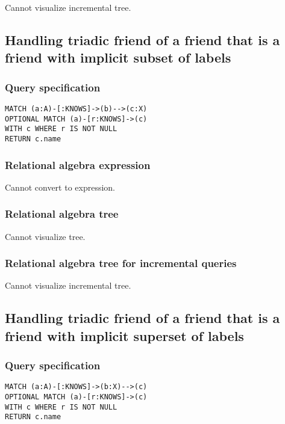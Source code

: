 Cannot visualize incremental tree.

\subsection{Handling triadic friend of a friend that is a friend with implicit subset of labels}

\subsubsection*{Query specification}

\begin{lstlisting}
MATCH (a:A)-[:KNOWS]->(b)-->(c:X)
OPTIONAL MATCH (a)-[r:KNOWS]->(c)
WITH c WHERE r IS NOT NULL
RETURN c.name
\end{lstlisting}

\subsubsection*{Relational algebra expression}

Cannot convert to expression.

\subsubsection*{Relational algebra tree}

Cannot visualize tree.

\subsubsection*{Relational algebra tree for incremental queries}

Cannot visualize incremental tree.

\subsection{Handling triadic friend of a friend that is a friend with implicit superset of labels}

\subsubsection*{Query specification}

\begin{lstlisting}
MATCH (a:A)-[:KNOWS]->(b:X)-->(c)
OPTIONAL MATCH (a)-[r:KNOWS]->(c)
WITH c WHERE r IS NOT NULL
RETURN c.name
\end{lstlisting}

